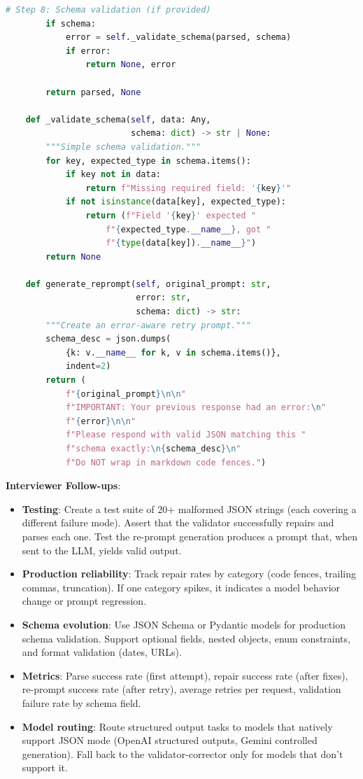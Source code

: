 \begin{lstlisting}[language=Python]
        # Step 8: Schema validation (if provided)
        if schema:
            error = self._validate_schema(parsed, schema)
            if error:
                return None, error

        return parsed, None

    def _validate_schema(self, data: Any,
                         schema: dict) -> str | None:
        """Simple schema validation."""
        for key, expected_type in schema.items():
            if key not in data:
                return f"Missing required field: '{key}'"
            if not isinstance(data[key], expected_type):
                return (f"Field '{key}' expected "
                    f"{expected_type.__name__}, got "
                    f"{type(data[key]).__name__}")
        return None

    def generate_reprompt(self, original_prompt: str,
                          error: str,
                          schema: dict) -> str:
        """Create an error-aware retry prompt."""
        schema_desc = json.dumps(
            {k: v.__name__ for k, v in schema.items()},
            indent=2)
        return (
            f"{original_prompt}\n\n"
            f"IMPORTANT: Your previous response had an error:\n"
            f"{error}\n\n"
            f"Please respond with valid JSON matching this "
            f"schema exactly:\n{schema_desc}\n"
            f"Do NOT wrap in markdown code fences.")
\end{lstlisting}

\textbf{Interviewer Follow-ups}:
\begin{itemize}[leftmargin=*]
    \item \textbf{Testing}: Create a test suite of 20+ malformed JSON strings (each covering a different failure mode). Assert that the validator successfully repairs and parses each one. Test the re-prompt generation produces a prompt that, when sent to the LLM, yields valid output.
    \item \textbf{Production reliability}: Track repair rates by category (code fences, trailing commas, truncation). If one category spikes, it indicates a model behavior change or prompt regression.
    \item \textbf{Schema evolution}: Use JSON Schema or Pydantic models for production schema validation. Support optional fields, nested objects, enum constraints, and format validation (dates, URLs).
    \item \textbf{Metrics}: Parse success rate (first attempt), repair success rate (after fixes), re-prompt success rate (after retry), average retries per request, validation failure rate by schema field.
    \item \textbf{Model routing}: Route structured output tasks to models that natively support JSON mode (OpenAI structured outputs, Gemini controlled generation). Fall back to the validator-corrector only for models that don't support it.
\end{itemize}

